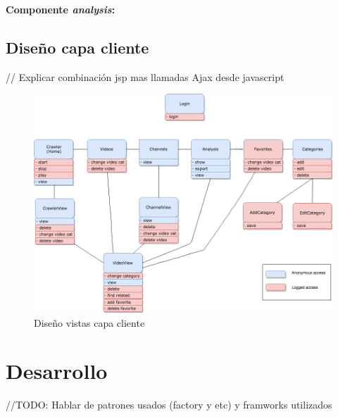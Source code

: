 \documentclass[11pt,a4paper]{article}
\begin{document}
\noindent\textbf{Componente \textit{analysis}:}
\begin{table}[H]
\centering
{}
\caption{Componente \textit{analysis} API}
\end{table}

\medskip 

\subsection{Diseño capa cliente}
// Explicar combinación jsp mas llamadas Ajax desde javascript

\begin{figure}[H]
\centering
\includegraphics[scale=0.25]{diseno/capaCliente.png}
\caption{Diseño vistas capa cliente}
\end{figure}

\newpage 




\section{Desarrollo}
\bigskip

//TODO: Hablar de patrones usados (factory y etc) y framworks utilizados
\end{document}
